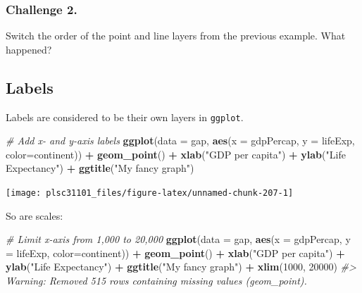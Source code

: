 \documentclass[]{book}
\newenvironment{Shaded}{\begin{snugshade}}{\end{snugshade}}
\newcommand{\KeywordTok}[1]{\textcolor[rgb]{0.13,0.29,0.53}{\textbf{#1}}}
\newcommand{\DataTypeTok}[1]{\textcolor[rgb]{0.13,0.29,0.53}{#1}}
\newcommand{\DecValTok}[1]{\textcolor[rgb]{0.00,0.00,0.81}{#1}}
\newcommand{\StringTok}[1]{\textcolor[rgb]{0.31,0.60,0.02}{#1}}
\newcommand{\CommentTok}[1]{\textcolor[rgb]{0.56,0.35,0.01}{\textit{#1}}}
\newcommand{\OperatorTok}[1]{\textcolor[rgb]{0.81,0.36,0.00}{\textbf{#1}}}
\newcommand{\NormalTok}[1]{#1}
\begin{document}
\subsubsection*{Challenge 2.}\label{challenge-2.-5}

Switch the order of the point and line layers from the previous example.
What happened?

\subsection{Labels}\label{labels-1}

Labels are considered to be their own layers in \texttt{ggplot}.

\begin{Shaded}
\begin{Highlighting}[]
\CommentTok{# Add x- and y-axis labels}
\KeywordTok{ggplot}\NormalTok{(}\DataTypeTok{data =}\NormalTok{ gap, }\KeywordTok{aes}\NormalTok{(}\DataTypeTok{x =}\NormalTok{ gdpPercap, }\DataTypeTok{y =}\NormalTok{ lifeExp, }\DataTypeTok{color=}\NormalTok{continent)) }\OperatorTok{+}\StringTok{ }
\StringTok{  }\KeywordTok{geom_point}\NormalTok{() }\OperatorTok{+}\StringTok{ }
\StringTok{  }\KeywordTok{xlab}\NormalTok{(}\StringTok{"GDP per capita"}\NormalTok{) }\OperatorTok{+}\StringTok{ }
\StringTok{  }\KeywordTok{ylab}\NormalTok{(}\StringTok{"Life Expectancy"}\NormalTok{) }\OperatorTok{+}\StringTok{ }
\StringTok{  }\KeywordTok{ggtitle}\NormalTok{(}\StringTok{"My fancy graph"}\NormalTok{)}
\end{Highlighting}
\end{Shaded}

\begin{center}\texttt{[image: plsc31101\_files/figure-latex/unnamed-chunk-207-1]} \end{center}

So are scales:

\begin{Shaded}
\begin{Highlighting}[]
\CommentTok{# Limit x-axis from 1,000 to 20,000}
\KeywordTok{ggplot}\NormalTok{(}\DataTypeTok{data =}\NormalTok{ gap, }\KeywordTok{aes}\NormalTok{(}\DataTypeTok{x =}\NormalTok{ gdpPercap, }\DataTypeTok{y =}\NormalTok{ lifeExp, }\DataTypeTok{color=}\NormalTok{continent)) }\OperatorTok{+}\StringTok{ }
\StringTok{  }\KeywordTok{geom_point}\NormalTok{() }\OperatorTok{+}\StringTok{ }
\StringTok{  }\KeywordTok{xlab}\NormalTok{(}\StringTok{"GDP per capita"}\NormalTok{) }\OperatorTok{+}\StringTok{ }
\StringTok{  }\KeywordTok{ylab}\NormalTok{(}\StringTok{"Life Expectancy"}\NormalTok{) }\OperatorTok{+}\StringTok{ }
\StringTok{  }\KeywordTok{ggtitle}\NormalTok{(}\StringTok{"My fancy graph"}\NormalTok{) }\OperatorTok{+}\StringTok{ }
\StringTok{  }\KeywordTok{xlim}\NormalTok{(}\DecValTok{1000}\NormalTok{, }\DecValTok{20000}\NormalTok{)}
\CommentTok{#> Warning: Removed 515 rows containing missing values (geom_point).}
\end{Highlighting}
\end{Shaded}
\end{document}
